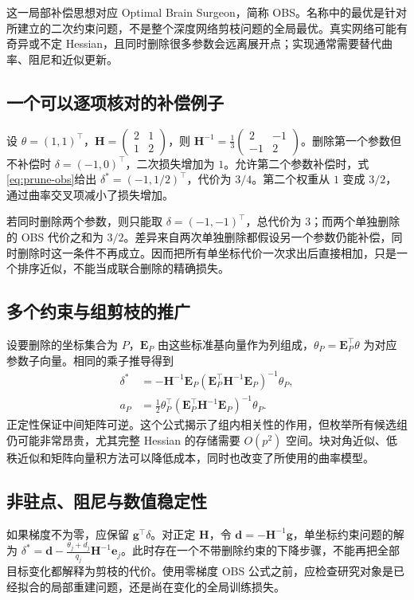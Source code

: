 \documentclass[UTF8,12pt,a4paper,fontset=fandol]{ctexart}
\begin{document}
这一局部补偿思想对应 Optimal Brain Surgeon，简称 OBS\cite{hassibi1992}。名称中的最优是针对所建立的二次约束问题，不是整个深度网络剪枝问题的全局最优。真实网络可能有奇异或不定 Hessian，且同时删除很多参数会远离展开点；实现通常需要替代曲率、阻尼和近似更新。

\subsection{一个可以逐项核对的补偿例子}
设 $\theta=(1,1)^\top$，$\mathbf H=\left(\begin{smallmatrix}2&1\\1&2\end{smallmatrix}\right)$，则 $\mathbf H^{-1}=\tfrac13\left(\begin{smallmatrix}2&-1\\-1&2\end{smallmatrix}\right)$。删除第一个参数但不补偿时 $\delta=(-1,0)^\top$，二次损失增加为 $1$。允许第二个参数补偿时，式\eqref{eq:prune-obs}给出 $\delta^*=(-1,1/2)^\top$，代价为 $3/4$。第二个权重从 $1$ 变成 $3/2$，通过曲率交叉项减小了损失增加。

若同时删除两个参数，则只能取 $\delta=(-1,-1)^\top$，总代价为 $3$；而两个单独删除的 OBS 代价之和为 $3/2$。差异来自两次单独删除都假设另一个参数仍能补偿，同时删除时这一条件不再成立。因而把所有单坐标代价一次求出后直接相加，只是一个排序近似，不能当成联合删除的精确损失。

\subsection{多个约束与组剪枝的推广}
设要删除的坐标集合为 $P$，$\mathbf E_P$ 由这些标准基向量作为列组成，$\theta_P=\mathbf E_P^\top\theta$ 为对应参数子向量。相同的乘子推导得到
\begin{align}
 \delta^*&=-\mathbf H^{-1}\mathbf E_P
 (\mathbf E_P^\top\mathbf H^{-1}\mathbf E_P)^{-1}\theta_P,\label{eq:prune-group-update}\\
 a_P&=\frac12\theta_P^\top
 (\mathbf E_P^\top\mathbf H^{-1}\mathbf E_P)^{-1}\theta_P.
 \label{eq:prune-group-cost}
\end{align}
正定性保证中间矩阵可逆。这个公式揭示了组内相关性的作用，但枚举所有候选组仍可能非常昂贵，尤其完整 Hessian 的存储需要 $O(p^2)$ 空间。块对角近似、低秩近似和矩阵向量积方法可以降低成本，同时也改变了所使用的曲率模型。

\subsection{非驻点、阻尼与数值稳定性}
如果梯度不为零，应保留 $\mathbf g^\top\delta$。对正定 $\mathbf H$，令 $\mathbf d=-\mathbf H^{-1}\mathbf g$，单坐标约束问题的解为 $\delta^*=\mathbf d-\frac{\theta_j+d_j}{q_j}\mathbf H^{-1}\mathbf e_j$。此时存在一个不带删除约束的下降步骤，不能再把全部目标变化都解释为剪枝的代价。使用零梯度 OBS 公式之前，应检查研究对象是已经拟合的局部重建问题，还是尚在变化的全局训练损失。
\end{document}
